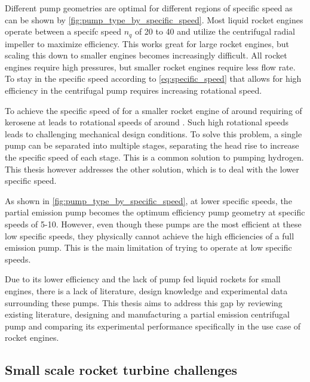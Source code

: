 Different pump geometries are optimal for different regions of specific speed as can be shown by \cref{fig:pump_type_by_specific_speed}. Most liquid rocket engines operate between a specifc speed $n_q$ of 20 to 40 and utilize the centrifugal radial impeller to maximize efficiency. This works great for large rocket engines, but scaling this down to smaller engines becomes increasingly difficult. All rocket engines require high pressures, but smaller rocket engines require less flow rate. To stay in the specific speed according to \cref{eq:specific_speed} that allows for high efficiency in the centrifugal pump requires increasing rotational speed.

To achieve the specific speed of \valSamplepumpNq for a smaller rocket engine of around \valSamplepumpThrust requiring \valSamplepumpMdot of kerosene at \valSamplepumpP leads to rotational speeds of around \valSamplepumpN . Such high rotational speeds leads to challenging mechanical design conditions. To solve this problem, a single pump can be separated into multiple stages, separating the head rise to increase the specific speed of each stage. This is a common solution to pumping hydrogen. This thesis however addresses the other solution, which is to deal with the lower specific speed.

As shown in \cref{fig:pump_type_by_specific_speed}, at lower specific speeds, the partial emission pump becomes the optimum efficiency pump geometry at specific speeds of  5-10. However, even though these pumps are the most efficient at these low specific speeds, they physically cannot achieve the high efficiencies of a full emission pump. This is the main limitation of trying to operate at low specific speeds.  

Due to its lower efficiency and the lack of pump fed liquid rockets for small engines, there is a lack of literature, design knowledge and experimental data surrounding these pumps. This thesis aims to address this gap by reviewing existing literature, designing and manufacturing a partial emission centrifugal pump and comparing its experimental performance specifically in the use case of rocket engines.

\subsection{Small scale rocket turbine challenges}

